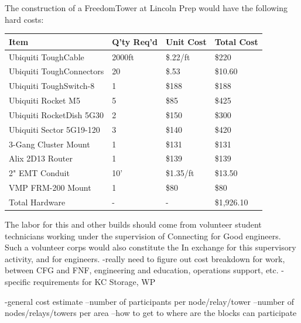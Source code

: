 The construction of a FreedomTower at Lincoln Prep would
have the following hard costs:
\begin{center}
\begin{tabular}{|p{5cm}|l|l|l|}
\hline
Item & Q'ty Req'd & Unit Cost & Total Cost \\ \hline
Ubiquiti ToughCable & 2000ft & \$.22/ft & \$220 \\ \hline
Ubiquiti ToughConnectors & 20 & \$.53 & \$10.60 \\ \hline
Ubiquiti ToughSwitch-8 & 1 & \$188 & \$188 \\ \hline
Ubiquiti Rocket M5 & 5 & \$85 & \$425 \\ \hline
Ubiquiti RocketDish 5G30 & 2 & \$150 & \$300 \\ \hline
Ubiquiti Sector 5G19-120 & 3 & \$140 & \$420 \\ \hline
3-Gang Cluster Mount & 1 & \$131 & \$131 \\ \hline
Alix 2D13 Router & 1 & \$139 & \$139 \\ \hline
2" EMT Conduit & 10' & \$1.35/ft & \$13.50 \\ \hline
VMP FRM-200 Mount & 1 & \$80 & \$80 \\ \hline
Total Hardware & - & - & \$1,926.10 \\ \hline
\end{tabular}
\end{center}
The labor for this and other builds should come from volunteer student technicians working
under the supervision of Connecting for Good engineers. Such a volunteer corps
would also constitute the In exchange for this
supervisory activity, and for
engineers. 
-really need to figure out cost breakdown for work, between CFG and FNF,
engineering and education, operations support, etc.
-specific requirements for KC Storage, WP

-general cost estimate
--number of participants per node/relay/tower
--number of nodes/relays/towers per area
--how to get to where are the blocks can participate

